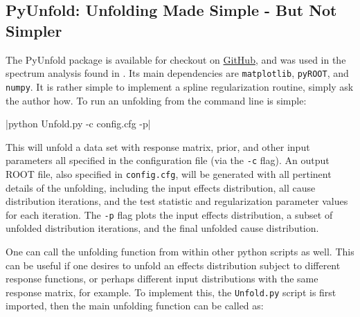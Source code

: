


\subsection{PyUnfold: Unfolding Made Simple - But Not Simpler}
The PyUnfold package is available for checkout on \href{https://github.com/zhampel/PyUnfold}{GitHub},
and was used in the spectrum analysis found in \cite{hawc-cr-spectrum}.
Its main dependencies are \verb|matplotlib|, \verb|pyROOT|, and \verb|numpy|.
It is rather simple to implement a spline regularization routine, simply ask the author how.
To run an unfolding from the command line is simple:

|python Unfold.py -c config.cfg -p|

This will unfold a data set with response matrix, prior, and other input parameters all specified in the configuration file (via the \verb|-c| flag).
An output ROOT \cite{root} file, also specified in \verb|config.cfg|, will be generated with all pertinent details of the unfolding, 
including the input effects distribution, all cause distribution iterations, and the test statistic and regularization parameter values for each iteration.
The \verb|-p| flag plots the input effects distribution, a subset of unfolded distribution iterations, and the final unfolded cause distribution.


One can call the unfolding function from within other python scripts as well.
This can be useful if one desires to unfold an effects distribution subject to different response functions,
or perhaps different input distributions with the same response matrix, for example. 
To implement this, the \verb|Unfold.py| script is first imported, then the main unfolding function can be called as:

